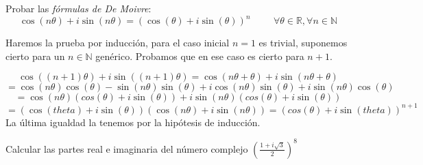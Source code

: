 \begin{ejer}
	Probar las \textit{fórmulas de De Moivre}:
	$$ \cos(n\theta) + i\sin(n\theta) = (\cos(\theta)+i\sin(\theta))^n \hspace{1cm}\forall\theta\in\mathbb{R}, \forall n\in\mathbb{N} $$
\end{ejer}


\begin{sol}
Haremos la prueba por inducción, para el caso inicial $n=1$ es trivial, suponemos cierto para un $n\in\mathbb{N}$ genérico.
Probamos que en ese caso es cierto para $n+1$.

$$ 
\cos((n+1)\theta)+i\sin((n+1)\theta) 
=
\cos(n\theta+\theta)+i\sin(n\theta+\theta)
$$
$$ =
\cos(n\theta) \cos(\theta)- \sin(n\theta)\sin(\theta) +i\cos(n\theta)\sin(\theta) + i\sin(n\theta)\cos(\theta) $$
$$ =
\cos(n\theta)(cos(\theta)+i\sin(\theta)) + i\sin(n\theta)(cos(\theta)+i\sin(\theta))
$$
$$=
(\cos(theta)+i\sin(\theta)) (\cos(n\theta)+i\sin(n\theta))
=
(cos(\theta)+i\sin(theta))^{n+1}
$$
La última igualdad la tenemos por la hipótesis de inducción.
\end{sol}



\begin{ejer}
	Calcular las partes real e imaginaria del número complejo 
	$\left( \frac{1+i\sqrt{3}}{2} \right)^8$
\end{ejer}


